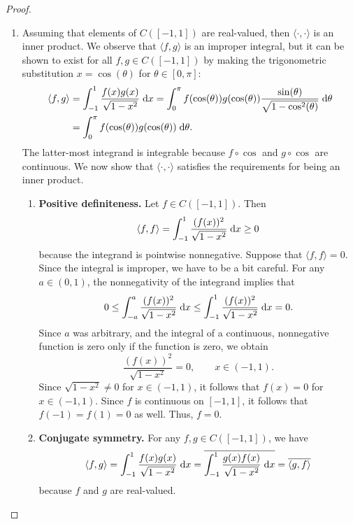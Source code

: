 \documentclass{homework}
\begin{document}
\begin{proof}
\begin{enumerate}
			\item Assuming that elements of $C([-1,1])$ are real-valued, then $\langle\cdot,\cdot\rangle$ is an inner product. We observe that $\langle f,g\rangle$ is an improper integral, but it can be shown to exist for all $f, g \in C([-1,1])$ by making the trigonometric substitution $x = \cos(\theta)$ for $\theta \in [0,\pi]$:
			\begin{equation*}
			\begin{aligned}
				\langle f, g\rangle &= \int_{-1}^1 \frac{f(x)g(x)}{\sqrt{1-x^2}}\;\text{d} x = \int_0^\pi f(\cos(\theta))g(\cos(\theta))\frac{\sin(\theta)}{\sqrt{1-\cos^2(\theta)}}\;\text{d}\theta \\
				&= \int_0^\pi f(\cos(\theta))g(\cos(\theta))\;\text{d}\theta.
			\end{aligned}
			\end{equation*}
			The latter-most integrand is integrable because $f\circ \cos$ and $g\circ \cos$ are continuous. We now show that $\langle\cdot,\cdot\rangle$ satisfies the requirements for being an inner product.
			\begin{enumerate}
				\item \textbf{Positive definiteness.} Let $f \in C([-1,1])$. Then
				\begin{equation*}
					\langle f, f\rangle = \int_{-1}^1 \frac{(f(x))^2}{\sqrt{1-x^2}}\;\text{d} x \ge 0
				\end{equation*}
				because the integrand is pointwise nonnegative. Suppose that $\langle f, f \rangle = 0$. Since the integral is improper, we have to be a bit careful. For any $a \in (0,1)$, the nonnegativity of the integrand implies that
				\begin{equation*}
					0 \le \int_{-a}^a \frac{(f(x))^2}{\sqrt{1-x^2}}\;\text{d} x \le \int_{-1}^1\frac{(f(x))^2}{\sqrt{1-x^2}}\;\text{d} x = 0.
				\end{equation*}
				Since $a$ was arbitrary, and the integral of a continuous, nonnegative function is zero only if the function is zero, we obtain
				\begin{equation*}
					\frac{(f(x))^2}{\sqrt{1-x^2}} = 0, \qquad x \in (-1,1).
				\end{equation*}
				Since $\sqrt{1-x^2} \ne 0$ for $x \in (-1,1)$, it follows that $f(x) = 0$ for $x \in (-1,1)$. Since $f$ is continuous on $[-1,1]$, it follows that $f(-1)=f(1) = 0$ as well. Thus, $f = 0$.
				
				\item \textbf{Conjugate symmetry.} For any $f, g\in C([-1,1])$, we have
				\begin{equation*}
					\langle f, g\rangle = \int_{-1}^1\frac{f(x)g(x)}{\sqrt{1-x^2}}\;\text{d} x = \overline{\int_{-1}^1 \frac{g(x)f(x)}{\sqrt{1-x^2}}\;\text{d} x} = \overline{\langle g, f\rangle}
				\end{equation*}
				because $f$ and $g$ are real-valued.
				

\end{enumerate}
\end{enumerate}
\end{proof}
\end{document}
